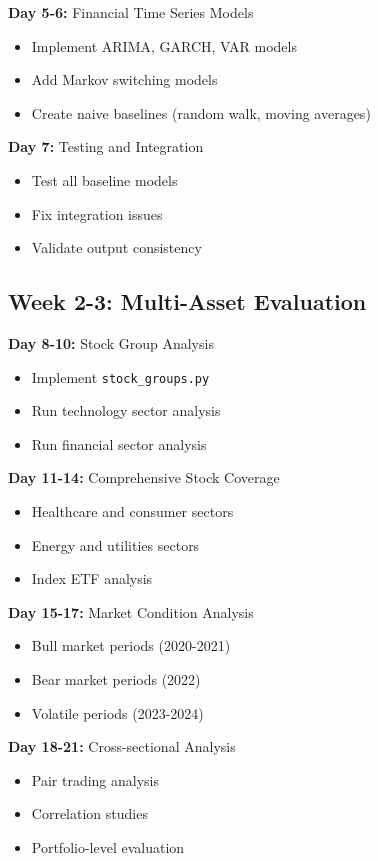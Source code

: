 \documentclass[11pt]{article}
\begin{document}
\textbf{Day 5-6:} Financial Time Series Models
\begin{itemize}
    \item Implement ARIMA, GARCH, VAR models
    \item Add Markov switching models
    \item Create naive baselines (random walk, moving averages)
\end{itemize}

\textbf{Day 7:} Testing and Integration
\begin{itemize}
    \item Test all baseline models
    \item Fix integration issues
    \item Validate output consistency
\end{itemize}

\subsection{Week 2-3: Multi-Asset Evaluation}

\textbf{Day 8-10:} Stock Group Analysis
\begin{itemize}
    \item Implement \texttt{stock\_groups.py}
    \item Run technology sector analysis
    \item Run financial sector analysis
\end{itemize}

\textbf{Day 11-14:} Comprehensive Stock Coverage
\begin{itemize}
    \item Healthcare and consumer sectors
    \item Energy and utilities sectors
    \item Index ETF analysis
\end{itemize}

\textbf{Day 15-17:} Market Condition Analysis
\begin{itemize}
    \item Bull market periods (2020-2021)
    \item Bear market periods (2022)
    \item Volatile periods (2023-2024)
\end{itemize}

\textbf{Day 18-21:} Cross-sectional Analysis
\begin{itemize}
    \item Pair trading analysis
    \item Correlation studies
    \item Portfolio-level evaluation
\end{itemize}
\end{document}
